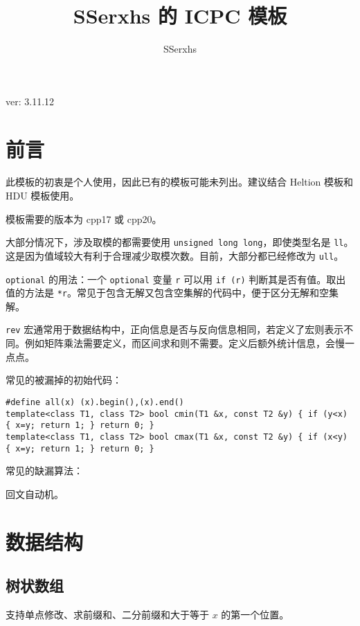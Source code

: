 \documentclass[12pt]{ctexart}
\author{SSerxhs}
\title{SSerxhs 的 ICPC 模板}
\begin{document}
\maketitle

\centerline{ver: 3.11.12}

\tableofcontents

\newpage

\section{前言}

此模板的初衷是个人使用，因此已有的模板可能未列出。建议结合 Heltion 模板和 HDU 模板使用。

模板需要的版本为 cpp17 或 cpp20。

大部分情况下，涉及取模的都需要使用 \verb|unsigned long long|，即使类型名是 \verb|ll|。这是因为值域较大有利于合理减少取模次数。目前，大部分都已经修改为 \verb|ull|。

\verb|optional| 的用法：一个 \verb|optional| 变量 \verb|r| 可以用 \verb|if (r)| 判断其是否有值。取出值的方法是 \verb|*r|。常见于包含无解又包含空集解的代码中，便于区分无解和空集解。

\verb|rev| 宏通常用于数据结构中，正向信息是否与反向信息相同，若定义了宏则表示不同。例如矩阵乘法需要定义，而区间求和则不需要。定义后额外统计信息，会慢一点点。

常见的被漏掉的初始代码：
\begin{lstlisting}
#define all(x) (x).begin(),(x).end()
template<class T1, class T2> bool cmin(T1 &x, const T2 &y) { if (y<x) { x=y; return 1; } return 0; }
template<class T1, class T2> bool cmax(T1 &x, const T2 &y) { if (x<y) { x=y; return 1; } return 0; }
\end{lstlisting}

常见的缺漏算法：

回文自动机。

\newpage

\section{数据结构}

\subsection{树状数组}

支持单点修改、求前缀和、二分前缀和大于等于 $x$ 的第一个位置。
\end{document}
